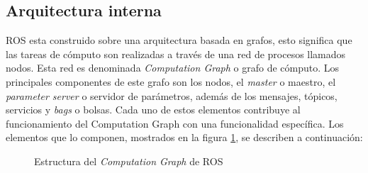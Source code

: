 \subsection{Arquitectura interna}
ROS esta construido sobre una arquitectura basada en grafos, esto significa que las tareas de cómputo son realizadas a través de una red de procesos llamados nodos. Esta red es denominada \textit{Computation Graph} o grafo de cómputo.\newline
Los principales componentes de este grafo son los nodos, el \textit{master} o maestro, el \textit{parameter server} o servidor de parámetros, además de los mensajes, tópicos, servicios y \textit{bags} o bolsas. Cada uno de estos elementos contribuye al funcionamiento del Computation Graph con una funcionalidad específica. Los elementos que lo componen, mostrados en la figura \ref{fig:computationGraph}, se describen a continuación:

\newpage

\begin{figure}[ht]
    \centering
    \def\svgwidth{350pt}
    
    \caption{Estructura del \textit{Computation Graph} de ROS}
    \label{fig:computationGraph}
\end{figure}

